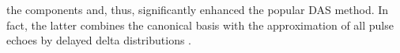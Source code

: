 the components and, thus, significantly enhanced
the popular \ac{DAS} method.
In fact,
the latter combines
the canonical basis with
the approximation of
all pulse echoes by
delayed  delta distributions
\cite[Sect. IV.A.2]{article:DavidJASA2015}.

